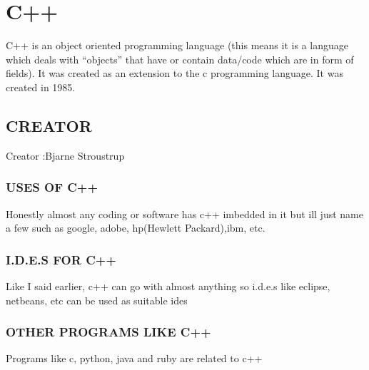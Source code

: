 \documentclass{article}
\begin{document}
	\section{C++}
	C++ is an object oriented programming language (this means it is a language which deals with “objects” that have or contain data/code which are in form of fields). It was created as an extension to the c programming language. It was created in 1985.
	\subsection{CREATOR}
	Creator :Bjarne Stroustrup
	\subsubsection{USES OF C++}
	Honestly almost any coding or software has c++ imbedded in it but ill just name a few such as google, adobe, hp(Hewlett Packard),ibm, etc.
	\subsubsection{I.D.E.S FOR C++}
	Like I said earlier, c++ can go with almost anything so i.d.e.s like eclipse, netbeans, etc can be used as suitable ides
	\subsubsection{OTHER PROGRAMS LIKE C++}
	Programs like c, python, java and ruby are related to c++
	
\end{document}
